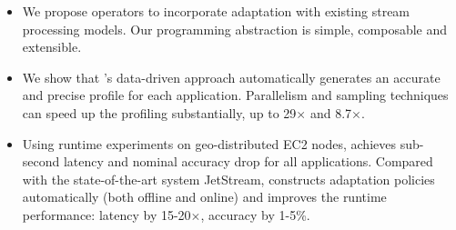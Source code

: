 \begin{itemize}[leftmargin=*, topsep=3pt]

\item We propose \maybe{} operators to incorporate adaptation with existing
  stream processing models. Our programming abstraction is simple, composable
  and extensible.

\item We show that \sysname{}'s data-driven approach automatically generates an
  accurate and precise profile for each application. Parallelism and sampling
  techniques can speed up the profiling substantially, up to 29$\times$ and
  8.7$\times$\@.

\item Using runtime experiments on geo-distributed EC2 nodes, \sysname{}
  achieves sub-second latency and nominal accuracy drop for all
  applications. Compared with the state-of-the-art system JetStream, \sysname{}
  constructs adaptation policies automatically (both offline and online) and
  improves the runtime performance: latency by 15-20$\times$, accuracy by 1-5\%.

\end{itemize}


